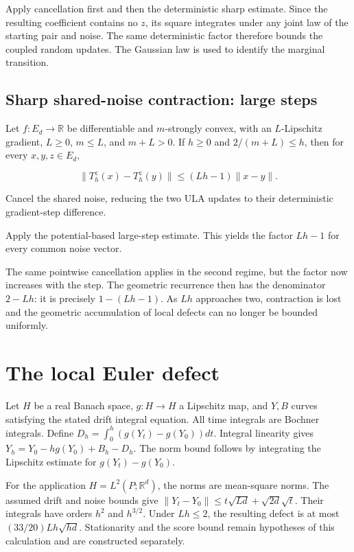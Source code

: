 \documentclass[11pt,a4paper]{article}
\begin{document}
Apply cancellation first and then the deterministic sharp estimate. Since the resulting coefficient contains no \(z\), its square integrates under any joint law of the starting pair and noise. The same deterministic factor therefore bounds the coupled random updates. The Gaussian law is used to identify the marginal transition.


\subsection{\texorpdfstring{Sharp shared-noise contraction: large steps}{Sharp shared-noise contraction: large steps}}


Let \(f:E_d\to\mathbb R\) be differentiable and \(m\)-strongly convex, with an \(L\)-Lipschitz gradient, \(L\ge0\), \(m\le L\), and \(m+L>0\). If \(h\ge0\) and \(2/(m+L)\le h\), then for every \(x,y,z\in E_d\),

\[\|T_h^z(x)-T_h^z(y)\|\le(Lh-1)\|x-y\|.\]

Cancel the shared noise, reducing the two ULA updates to their deterministic gradient-step difference.



Apply the potential-based large-step estimate. This yields the factor \(Lh-1\) for every common noise vector.



The same pointwise cancellation applies in the second regime, but the factor now increases with the step. The geometric recurrence then has the denominator \(2-Lh\): it is precisely \(1-(Lh-1)\). As \(Lh\) approaches two, contraction is lost and the geometric accumulation of local defects can no longer be bounded uniformly.


\section{\texorpdfstring{The local Euler defect}{The local Euler defect}}


Let \(H\) be a real Banach space, \(g:H\to H\) a Lipschitz map, and \(Y,B\) curves satisfying the stated drift integral equation. All time integrals are Bochner integrals. Define \(D_h=\int_0^h(g(Y_t)-g(Y_0))dt\). Integral linearity gives \(Y_h=Y_0-hg(Y_0)+B_h-D_h\). The norm bound follows by integrating the Lipschitz estimate for \(g(Y_t)-g(Y_0)\).



For the application \(H=L^2(P;\mathbb R^d)\), the norms are mean-square norms. The assumed drift and noise bounds give \(\|Y_t-Y_0\|\le t\sqrt{Ld}+\sqrt{2d}\sqrt t\). Their integrals have orders \(h^2\) and \(h^{3/2}\). Under \(Lh\le2\), the resulting defect is at most \((33/20)Lh\sqrt{hd}\). Stationarity and the score bound remain hypotheses of this calculation and are constructed separately.
\end{document}
